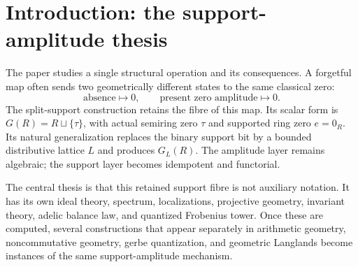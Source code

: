 \documentclass[11pt]{amsart}
\numberwithin{equation}{section}
\theoremstyle{definition}
\newcommand{\GL}{\operatorname{GL}}
\begin{document}
\begin{abstract}
Finite denominator phases admit nondegenerate quadratic refinements,
FHLT gerbe quantization, finite Heisenberg algebras, and theta modules.  The
matrix tower has universal UHF limit $\mathcal Q_\Omega$ with
\[
K_0(\mathcal Q_\Omega)\cong(\mathbf Q,\mathbf Q_{\ge0},1),\qquad
\mathcal D_\Omega\cong C(\widehat{\mathbf Z})\cong C^*(\mathbf Q/\mathbf Z).
\]
The identity $\GL_n(G_L(K))\cong N_{\GL_n}(T)(K)$ supplies a monomial
spectral chart: local systems are rank-one local systems on finite covers,
and every loop determinant factors over the cycles of the covering
monodromy.  On the Connes--Consani scaling-site covers these are Frobenius
cycles.  Split characteristic coefficients define a support-refined
Hitchin map, and pullback along the normalizer chart gives a monomial
restriction of the coarse geometric Langlands functor.  Finally, the
reciprocal-root skeleton of the perfect stalk has Beurling realization and
satisfies $x_{\Lambda_Q}\le d_Q^2$; density at the target section is the
Nyman--B\'aez-Duarte criterion and is equivalent to the Riemann hypothesis.
\end{abstract}

\maketitle
\tableofcontents

\section{Introduction: the support-amplitude thesis}
\label{sec:introduction}

The paper studies a single structural operation and its consequences.  A
forgetful map often sends two geometrically different states to the same
classical zero:
\[
\text{absence}\longmapsto0,
\qquad
\text{present zero amplitude}\longmapsto0.
\]
The split-support construction retains the fibre of this map.  Its scalar
form is $G(R)=R\sqcup\{\tau\}$, with actual semiring zero $\tau$ and
supported ring zero $e=0_R$.  Its natural generalization replaces the
binary support bit by a bounded distributive lattice $L$ and produces
$G_L(R)$.  The amplitude layer remains algebraic; the support layer becomes
idempotent and functorial.

The central thesis is that this retained support fibre is not auxiliary
notation.  It has its own ideal theory, spectrum, localizations,
projective geometry, invariant theory, adelic balance law, and quantized
Frobenius tower.  Once these are computed, several constructions that
appear separately in arithmetic geometry, noncommutative geometry,
gerbe quantization, and geometric Langlands become instances of the same
support-amplitude mechanism.
\end{document}
